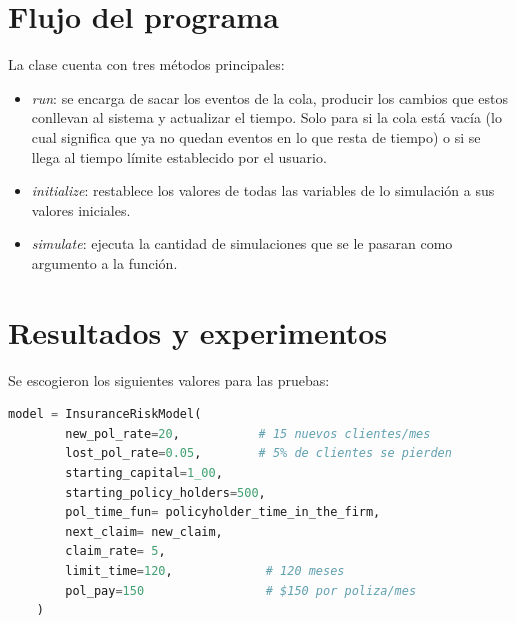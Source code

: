 \documentclass[spanish]{article}
\begin{document}
\section{Flujo del programa}
La clase cuenta con tres m\'etodos principales:
\begin{itemize}
    \item \textit{run}: se encarga de sacar los eventos de la cola, producir los cambios que estos conllevan al sistema y actualizar el tiempo. Solo para si la cola est\'a vac\'ia (lo cual significa que ya no quedan eventos en lo que resta de tiempo) o si se llega al tiempo l\'imite establecido por el usuario.
    \item \textit{initialize}: restablece los valores de todas las variables de lo simulaci\'on a sus valores iniciales.
    \item \textit{simulate}: ejecuta la cantidad de simulaciones que se le pasaran como argumento a la funci\'on.
\end{itemize}
\section{Resultados y experimentos}
Se escogieron los siguientes valores para las pruebas:
\begin{lstlisting}[language=Python]
    model = InsuranceRiskModel(
        new_pol_rate=20,           # 15 nuevos clientes/mes
        lost_pol_rate=0.05,        # 5% de clientes se pierden
        starting_capital=1_00,
        starting_policy_holders=500,
        pol_time_fun= policyholder_time_in_the_firm, 
        next_claim= new_claim, 
        claim_rate= 5,
        limit_time=120,             # 120 meses
        pol_pay=150                 # $150 por poliza/mes
    )
\end{lstlisting}
\end{document}
